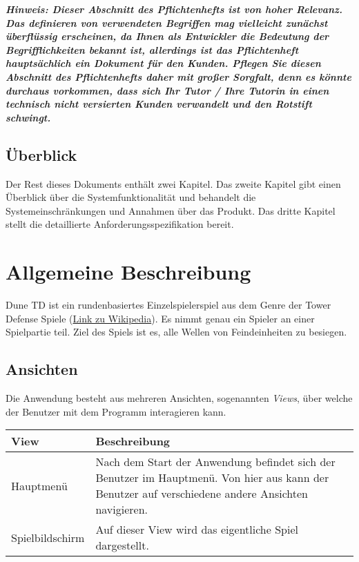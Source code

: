 \documentclass{uulm-assignment}
\begin{document}
\textbf{\textit{Hinweis: Dieser Abschnitt des Pflichtenhefts ist von hoher Relevanz. Das definieren von verwendeten Begriffen mag vielleicht zunächst überflüssig erscheinen, da Ihnen als Entwickler die Bedeutung der Begrifflichkeiten bekannt ist, allerdings ist das Pflichtenheft hauptsächlich ein Dokument für den Kunden. Pflegen Sie diesen Abschnitt des Pflichtenhefts daher mit großer Sorgfalt, denn es könnte durchaus vorkommen, dass sich Ihr Tutor / Ihre Tutorin in einen technisch nicht versierten Kunden verwandelt und den Rotstift schwingt.}}

\subsection{Überblick}

Der Rest dieses Dokuments enthält zwei Kapitel. Das zweite Kapitel gibt einen Überblick über die
Systemfunktionalität und behandelt die Systemeinschränkungen und Annahmen über das Produkt.
Das dritte Kapitel stellt die detaillierte Anforderungsspezifikation bereit.

\section{Allgemeine Beschreibung}

Dune TD ist ein rundenbasiertes Einzelspielerspiel aus dem Genre der Tower Defense Spiele (\href{https://de.wikipedia.org/wiki/Tower_Defense}{Link zu Wikipedia}). Es nimmt genau ein Spieler an einer Spielpartie teil. Ziel des Spiels ist es, alle Wellen von Feindeinheiten zu besiegen.

\subsection{Ansichten}

Die Anwendung besteht aus mehreren Ansichten, sogenannten \textit{Views}, über welche der Benutzer mit dem Programm interagieren kann.

\begin{tabularx}{16cm}{l|X}
\textbf{View} & \textbf{Beschreibung} \\
\hline
Hauptmenü & Nach dem Start der Anwendung befindet sich der Benutzer im Hauptmenü. Von hier aus kann der Benutzer auf verschiedene andere Ansichten navigieren. \\
\hline
Spielbildschirm & Auf dieser View wird das eigentliche Spiel dargestellt. \\
\end{tabularx}
\end{document}
